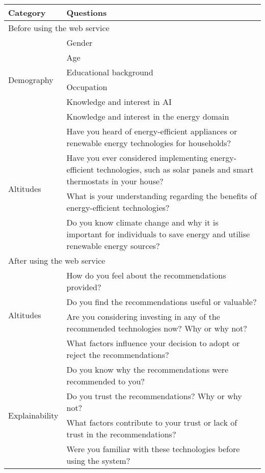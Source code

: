 \begin{center}
  \small
  \begin{longtable}{ | p{} | p{} | }
    \hline
    \textbf{Category} & \textbf{Questions} \\
    \hline
    \multicolumn{2}{|l|}{\cellcolor{lightgray}Before using the web service} \\
    \hline
    \multirow{6}{4em}{Demography} & Gender \\
    & Age \\
    & Educational background \\
    & Occupation \\
    & Knowledge and interest in AI \\
    & Knowledge and interest in the energy domain \\
    \hline
    \multirow{4}{4em}{Altitudes} & Have you heard of energy-efficient appliances or renewable energy technologies for households? \\
    & Have you ever considered implementing energy-efficient technologies, such as solar panels and smart thermostats in your house? \\
    & What is your understanding regarding the benefits of energy-efficient technologies? \\
    & Do you know climate change and why it is important for individuals to save energy and utilise renewable energy sources? \\
    \hline
    \multicolumn{2}{|l|}{\cellcolor{lightgray}After using the web service} \\
    \hline
    \multirow{4}{4em}{Altitudes} & How do you feel about the recommendations provided? \\
    & Do you find the recommendations useful or valuable? \\
    & Are you considering investing in any of the recommended technologies now? Why or why not? \\
    & What factors influence your decision to adopt or reject the recommendations? \\
    \hline
    \multirow{7}{4em}{Explainability} & Do you know why the recommendations were recommended to you? \\
    & Do you trust the recommendations? Why or why not? \\
    & What factors contribute to your trust or lack of trust in the recommendations? \\
    & Were you familiar with these technologies before using the system? \\

\end{longtable}
\end{center}
